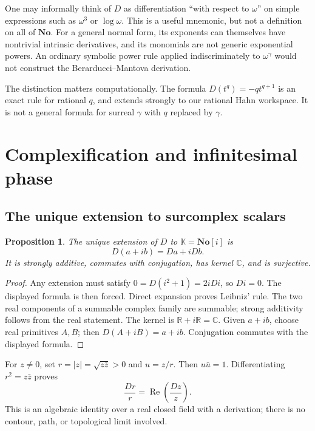 \documentclass[11pt,a4paper]{article}
\numberwithin{equation}{section}
\newtheorem{proposition}[theorem]{Proposition}
\theoremstyle{definition}
\theoremstyle{remark}
\newcommand{\No}{\mathbf{No}}
\newcommand{\K}{\mathbb K}
\newcommand{\C}{\mathbb C}
\newcommand{\R}{\mathbb R}
\newcommand{\Ree}{\operatorname{Re}}
\newcommand{\abs}[1]{\lvert #1\rvert}
\begin{document}
One may informally think of $D$ as differentiation ``with respect to
$\omega$'' on simple expressions such as $\omega^3$ or $\log\omega$.
This is a useful mnemonic, but not a definition on all of $\No$. For a
general normal form, its exponents can themselves have nontrivial
intrinsic derivatives, and its monomials are not generic exponential powers.
An ordinary symbolic power rule applied indiscriminately to
$\omega^\gamma$ would not construct the Berarducci--Mantova derivation.

The distinction matters computationally. The formula
$D(t^q)=-q t^{q+1}$ is an exact rule for rational $q$, and extends strongly
to our rational Hahn workspace. It is not a general formula for surreal
$\gamma$ with $q$ replaced by $\gamma$.

\section{Complexification and infinitesimal phase}
\label{sec:phase}

\subsection{The unique extension to surcomplex scalars}

\begin{proposition}\label{prop:complexify}
The unique extension of $D$ to $\K=\No[i]$ is
\[
 D(a+ib)=Da+iDb.
\]
It is strongly additive, commutes with conjugation, has kernel $\C$, and
is surjective.
\end{proposition}
\begin{proof}
Any extension must satisfy $0=D(i^2+1)=2iDi$, so $Di=0$.
The displayed formula is then forced. Direct expansion proves Leibniz'
rule. The two real components of a summable complex family are summable;
strong additivity follows from the real statement. The kernel is
$\R+i\R=\C$. Given $a+ib$, choose real primitives $A,B$; then
$D(A+iB)=a+ib$. Conjugation commutes with the displayed formula.
\end{proof}

For $z\ne0$, set $r=\abs z=\sqrt{z\bar z}>0$ and $u=z/r$. Then
$u\bar u=1$. Differentiating $r^2=z\bar z$ proves
\begin{equation}\label{eq:modulus-deriv}
 \frac{Dr}{r}=\Ree\left(\frac{Dz}{z}\right).
\end{equation}
This is an algebraic identity over a real closed field with a derivation;
there is no contour, path, or topological limit involved.
\end{document}
